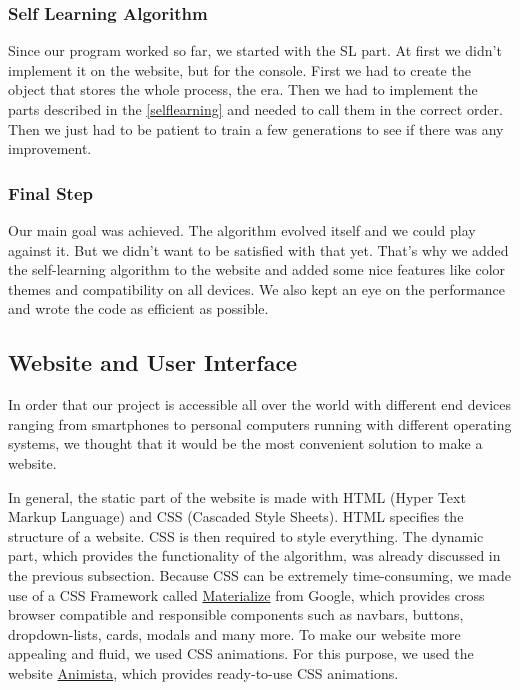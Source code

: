 \subsubsection{Self Learning Algorithm}
Since our program worked so far, we started with the \ac{SL} part. At first we didn't implement it on the website, but for the console. First we had to create the object that stores the whole process, the era. Then we had to implement the parts described in the \autoref{selflearning} and needed to call them in the correct order. Then we just had to be patient to train a few generations to see if there was any improvement.



\subsubsection{Final Step}
Our main goal was achieved. The algorithm evolved itself and we could play against it. But we didn't want to be satisfied with that yet. That's why we added the self-learning algorithm to the website and added some nice features like color themes and compatibility on all devices. We also kept an eye on the performance and wrote the code as efficient as possible.

\subsection{Website and User Interface} \label{websiteui}
In order that our project is accessible all over the world with different end devices ranging from smartphones to personal computers running with different operating systems, we thought that it would be the most convenient solution to make a website.

In general, the static part of the website is made with HTML (Hyper Text Markup Language) and CSS (Cascaded Style Sheets). HTML specifies the structure of a website.  CSS is then required to style everything. The dynamic part, which provides the functionality of the algorithm, was already discussed in the previous subsection. 
Because CSS can be extremely time-consuming, we made use of a CSS Framework called \href{https://materializecss.com/}{Materialize} from Google, which provides cross browser compatible and responsible components such as navbars, buttons, dropdown-lists, cards, modals and many more. To make our website more appealing and fluid, we used CSS animations. For this purpose, we used the website \href{http://animista.net/}{Animista}, which provides ready-to-use CSS animations.

